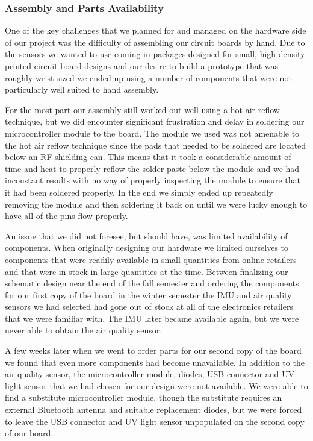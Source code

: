 \subsubsection{Assembly and Parts Availability}

One of the key challenges that we planned for and managed on the hardware side
of our project was the difficulty of assembling our circuit boards by hand. Due
to the sensors we wanted to use coming in packages designed for small, high
density printed circuit board designs and our desire to build a prototype that
was roughly wrist sized we ended up using a number of components that were not
particularly well suited to hand assembly.

For the most part our assembly still worked out well using a hot air reflow
technique, but we did encounter significant frustration and delay in soldering
our microcontroller module to the board. The module we used was not amenable to
the hot air reflow technique since the pads that needed to be soldered are
located below an RF shielding can. This means that it took a considerable amount
of time and heat to properly reflow the solder paste below the module and we had
inconstant results with no way of properly inspecting the module to ensure that
it had been soldered properly. In the end we simply ended up repeatedly removing
the module and then soldering it back on until we were lucky enough to have all
of the pins flow properly.

An issue that we did not foresee, but should have, was limited availability of
components. When originally designing our hardware we limited ourselves to
components that were readily available in small quantities from online
retailers and that were in stock in large quantities at the time. Between
finalizing our schematic design near the end of the fall semester and ordering
the components for our first copy of the board in the winter semester the IMU
and air quality sensors we had selected had gone out of stock at all of the
electronics retailers that we were familiar with. The IMU later became
available again, but we were never able to obtain the air quality sensor.

A few weeks later when we went to order parts for our second copy of the board
we found that even more components had become unavailable. In addition to the
air quality sensor, the microcontroller module, diodes, USB connector and UV
light sensor that we had chosen for our design were not available. We were
able to find a substitute microcontroller module, though the substitute requires
an external Bluetooth antenna and suitable replacement diodes, but we were
forced to leave the USB connector and UV light sensor unpopulated on the second
copy of our board.



